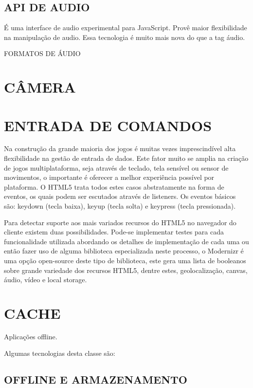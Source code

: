 \documentclass[11pt,a4paper]{article}
\begin{document}
\subsection{API DE AUDIO}

É uma interface de audio experimental para JavaScript. Provê maior
flexibilidade na manipulação de audio. Essa tecnologia é muito mais
nova do que a tag áudio. 

FORMATOS DE ÁUDIO

\section{CÂMERA}

\section{ ENTRADA DE COMANDOS}

Na construção da grande maioria dos jogos é muitas vezes
imprescindível alta flexibilidade na gestão de entrada de dados.
Este fator muito se amplia na criação de jogos multiplataforma,
seja através de teclado, tela sensível ou sensor de movimentos, o
importante é oferecer a melhor experiência possível por plataforma.
O HTML5 trata todos estes casos abstratamente na forma de eventos, os
quais podem ser escutados através de listeners. Os eventos básicos
são: keydown (tecla baixa), keyup (tecla solta) e keypress (tecla
pressionada).

Para detectar suporte aos mais variados recursos do HTML5 no navegador
do cliente existem duas possibilidades. Pode-se implementar testes para
cada funcionalidade utilizada abordando os detalhes de implementação
de cada uma ou então fazer uso de alguma biblioteca especializada
neste processo, o Modernizr é uma opção open-source deste tipo de
biblioteca, este gera uma lista de booleanos sobre grande variedade dos
recursos HTML5, dentre estes, geolocalização, canvas, áudio, vídeo e
local storage.

\section{CACHE}

Aplicações offline.

Algumas tecnologias desta classe são:

\subsection{ OFFLINE E ARMAZENAMENTO}
\end{document}
